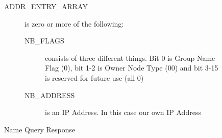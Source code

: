 \documentclass{article}
\begin{document}
\begin{figure}[H]
\begin{description}
		\item[ADDR\_ENTRY\_ARRAY] is zero or more of the following:
		      \begin{description}
			      \item[NB\_FLAGS] consists of three different things. Bit 0 is Group Name Flag (0), bit 1-2 is Owner Node Type (00) and bit 3-15 is reserved for future use (all 0)
			      \item[NB\_ADDRESS] is an IP Address. In this case our own IP Address
		      \end{description}
	\end{description}
	\caption{ Name Query Response\cite[sec. 4.2.13]{url:rfc:netbios-technical}}
	\label{fig:nbns-name-query-response}
\end{figure}
\end{document}

